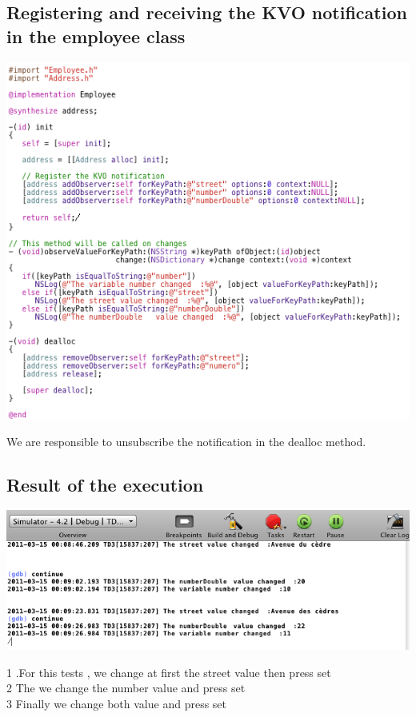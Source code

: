 \documentclass[a4paper,10pt]{article}
\begin{document}
			\subsection{Registering and receiving the KVO notification in the employee class }
			\begin{center}
						\includegraphics[scale=0.8]{./images/regrec.png}
			\end{center}
			We are responsible to unsubscribe the notification in the dealloc method. 
			\subsection{Result of the execution}
			\begin{center}
						\includegraphics[scale=0.6]{./images/result2KVO.png}
			\end{center}
			1 .For this tests , we change at first the street value then press set\\
			2 The we change the number value and press set\\
			3 Finally we change both value and press set\\
			
\end{document}
